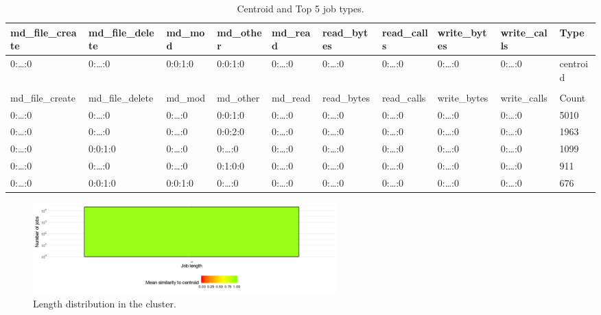 \documentclass[]{llncs}
\begin{document}
\begin{table}
	\centering
	\begin{tiny}
		\begin{tabular}{@{ }l@{ }@{ }l@{ }@{ }l@{ }@{ }l@{ }@{ }l@{ }@{ }l@{ }@{ }l@{ }@{ }l@{ }@{ }l@{ }@{ }l@{ }}
      md\_file\_create & md\_file\_delete & md\_mod   & md\_other & md\_read  & read\_bytes & read\_calls & write\_bytes & write\_calls & Type     \\ 
      \hline
      0:\dots:0        & 0:\dots:0        & 0:0:1:0   & 0:0:1:0   & 0:\dots:0 & 0:\dots:0   & 0:\dots:0   & 0:\dots:0    & 0:\dots:0    & centroid \\ 
                       &                  &           &           &           &             &             &              &              &          \\ 
      md\_file\_create & md\_file\_delete & md\_mod   & md\_other & md\_read  & read\_bytes & read\_calls & write\_bytes & write\_calls & Count    \\ 
      \hline
      0:\dots:0        & 0:\dots:0        & 0:\dots:0 & 0:0:1:0   & 0:\dots:0 & 0:\dots:0   & 0:\dots:0   & 0:\dots:0    & 0:\dots:0    & 5010     \\ 
      0:\dots:0        & 0:\dots:0        & 0:\dots:0 & 0:0:2:0   & 0:\dots:0 & 0:\dots:0   & 0:\dots:0   & 0:\dots:0    & 0:\dots:0    & 1963     \\ 
      0:\dots:0        & 0:0:1:0          & 0:\dots:0 & 0:\dots:0 & 0:\dots:0 & 0:\dots:0   & 0:\dots:0   & 0:\dots:0    & 0:\dots:0    & 1099     \\ 
      0:\dots:0        & 0:\dots:0        & 0:\dots:0 & 0:1:0:0   & 0:\dots:0 & 0:\dots:0   & 0:\dots:0   & 0:\dots:0    & 0:\dots:0    & 911      \\ 
      0:\dots:0        & 0:0:1:0          & 0:0:1:0   & 0:\dots:0 & 0:\dots:0 & 0:\dots:0   & 0:\dots:0   & 0:\dots:0    & 0:\dots:0    & 676      \\ 
		\end{tabular}
	\end{tiny}
  \caption{Centroid and Top 5 job types.}
  \label{tab:hex_native:top_jobs}
\end{table}


\begin{figure}
  \centering
  \includegraphics[width=4.61in,height=1.39in]{./media/image8.png}
  \caption{Length distribution in the cluster.}
  \label{fig:hex_native:length}
\end{figure}
\end{document}
